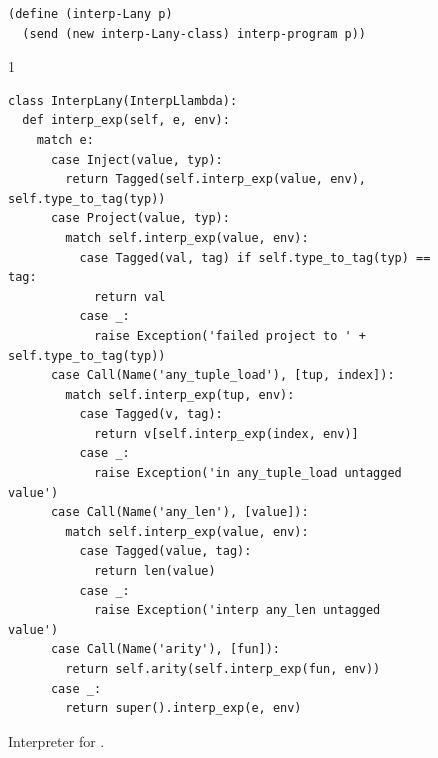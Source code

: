 \documentclass[7x10]{TimesAPriori_MIT}%
\def\pythonEd{1}
\def\edition{1}
\newcommand{\pythonColor}[0]{}
\numberwithin{theorem}{chapter}
\numberwithin{definition}{chapter}
\numberwithin{equation}{chapter}
\begin{document}
\begin{figure}[tbp]
\begin{tcolorbox}[colback=white]
{\begin{lstlisting}[basicstyle=\ttfamily\footnotesize]
(define (interp-Lany p)
  (send (new interp-Lany-class) interp-program p))
\end{lstlisting}
\fi}
{\if\edition\pythonEd\pythonColor
\begin{lstlisting}[basicstyle=\ttfamily\footnotesize]
class InterpLany(InterpLlambda):
  def interp_exp(self, e, env):
    match e:
      case Inject(value, typ):
        return Tagged(self.interp_exp(value, env), self.type_to_tag(typ))
      case Project(value, typ):
        match self.interp_exp(value, env):
          case Tagged(val, tag) if self.type_to_tag(typ) == tag:
            return val
          case _:
            raise Exception('failed project to ' + self.type_to_tag(typ))
      case Call(Name('any_tuple_load'), [tup, index]):
        match self.interp_exp(tup, env):
          case Tagged(v, tag):
            return v[self.interp_exp(index, env)]
          case _:
            raise Exception('in any_tuple_load untagged value')
      case Call(Name('any_len'), [value]):
        match self.interp_exp(value, env):
          case Tagged(value, tag):
            return len(value)
          case _:
            raise Exception('interp any_len untagged value')
      case Call(Name('arity'), [fun]):
        return self.arity(self.interp_exp(fun, env))
      case _:
        return super().interp_exp(e, env)
\end{lstlisting}
\fi}
  \end{tcolorbox}
\caption{Interpreter for \LangAny{}.}
\label{fig:interp-Lany}
\end{figure}
\end{document}

